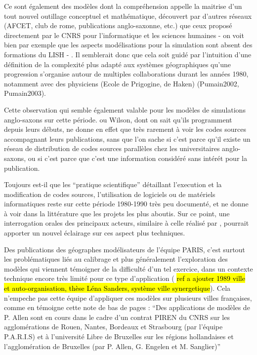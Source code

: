 Ce sont également des modèles dont la compréhension appelle la maitrise d'un tout nouvel outillage conceptuel et mathématique, découvert par d'autres réseaux (AFCET, club de rome, publications anglo-saxonne, etc.) que ceux proposé directement par le CNRS pour l'informatique et les sciences humaines - on voit bien par exemple que les aspects modélisations pour la simulation sont absent des formations du LISH - . Il semblerait donc que cela soit guidé par l'intuition d'une définition de la complexité plus adapté aux systèmes géographiques qu'une progression s'organise autour de multiples collaborations durant les années 1980, notamment avec des physiciens (Ecole de Prigogine, de Haken) (Pumain2002, Pumain2003).

Cette observation qui semble également valable pour les modèles de simulations anglo-saxons sur cette période. \textcite{Batty2014} ou Wilson, dont on sait qu'ils programment depuis leurs débuts, ne donne en effet que très rarement à voir les codes sources accompagnant leurs publications, sans que l’on sache si c’est parce qu’il existe un réseau de distribution de codes sources parallèles chez les universitaires anglo-saxons, ou si c’est parce que c’est une information considéré sans intérét pour la publication.

Toujours est-il que les \enquote{pratique scientifique} détaillant l’execution et la modification de codes sources, l'utilisation de logiciels ou de matériels informatiques reste sur cette période 1980-1990 très peu documenté, et ne donne à voir dans la littérature que les projets les plus aboutis. Sur ce point, une interrogation orales des principaux acteurs, similaire à celle réalisé par \textcite{Cuyala2014}, pourrait apporter un nouvel éclairage sur ces aspect plus techniques.

Des publications des géographes modélisateurs de l’équipe PARIS, c’est surtout les problématiques liés au calibrage et plus généralement l’exploration des modèles qui viennent témoigner de la difficulté d’un tel exercice, dans un contexte technique encore très limité pour ce type d’application (\hl{ ref a ajouter 1989 ville et auto-organisation, thèse Léna Sanders, système ville synergetique}). Cela n'empeche pas cette équipe d'appliquer ces modèles sur plusieurs villes françaises, comme en témoigne cette note de bas de pages \autocite[134]{Pumain1984} : \enquote{Des applications de modèles de P. Allen sont en cours dans le cadre d'un contrat PIREN du CNRS sur les agglomérations de Rouen, Nantes, Bordeaux et Strasbourg (par l'équipe P.A.R.I.S) et à l'université Libre de Bruxelles sur les régions hollandaises et l'agglomération de Bruxelles (par P. Allen, G. Engelen et M. Sanglier)}

